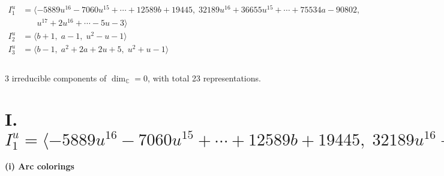 \documentclass[1p]{elsarticle_modified}
\theoremstyle{definition}
\begin{document}
\begin{align*}
I^u_{1}&=\langle 
-5889 u^{16}-7060 u^{15}+\cdots+12589 b+19445,\;32189 u^{16}+36655 u^{15}+\cdots+75534 a-90802,\\
\phantom{I^u_{1}}&\phantom{= \langle  }u^{17}+2 u^{16}+\cdots-5 u-3\rangle \\
I^u_{2}&=\langle 
b+1,\;a-1,\;u^2- u-1\rangle \\
I^u_{3}&=\langle 
b-1,\;a^2+2 a+2 u+5,\;u^2+u-1\rangle \\
\\
\end{align*}
\raggedright * 3 irreducible components of $\dim_{\mathbb{C}}=0$, with total 23 representations.\\
\newpage
\renewcommand{\arraystretch}{1}
\centering \section*{I. $I^u_{1}= \langle -5889 u^{16}-7060 u^{15}+\cdots+12589 b+19445,\;32189 u^{16}+36655 u^{15}+\cdots+75534 a-90802,\;u^{17}+2 u^{16}+\cdots-5 u-3 \rangle$}
\flushleft \textbf{(i) Arc colorings}\\
\end{document}
